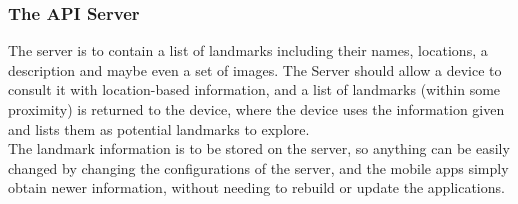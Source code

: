  \subsubsection{The API Server}
 The server is to contain a list of landmarks including their names, locations, a description and maybe even a set of images. The Server should allow a device to consult it with
 location-based information, and a list of landmarks (within some proximity) is returned to the device, where the device uses the information given and lists them as potential landmarks to explore.\\
 The landmark information is to be stored on the server, so anything can be easily changed by changing the configurations of the server, and the mobile apps simply obtain newer information, 
 without needing to rebuild or update the applications.